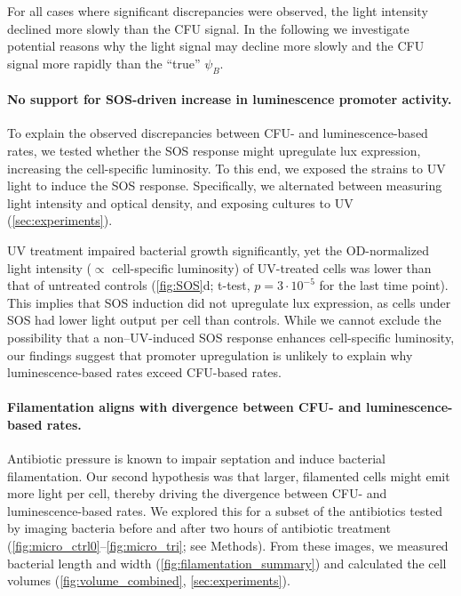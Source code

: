 For all cases where significant discrepancies were observed, the light intensity declined more slowly than the CFU signal.
In the following we investigate potential reasons why the light signal may decline more slowly and the CFU signal more rapidly than the ``true'' \(\psi_B\).

\paragraph{No support for SOS-driven increase in luminescence promoter activity.}
To explain the observed discrepancies between CFU- and luminescence-based rates, we tested whether the SOS response might upregulate lux expression, increasing the cell-specific luminosity.
To this end, we exposed the strains to UV light to induce the SOS response.
Specifically, we alternated between measuring light intensity and optical density, and exposing cultures to UV (\autoref{sec:experiments}).

UV treatment impaired bacterial growth significantly, yet the OD-normalized light intensity ($\propto$ cell-specific luminosity) of UV-treated cells was lower than that of untreated controls (\autoref{fig:SOS}d; t-test, $p = 3 \cdot 10^{-5}$ for the last time point).
This implies that SOS induction did not upregulate lux expression, as cells under SOS had lower light output per cell than controls.
While we cannot exclude the possibility that a non–UV-induced SOS response enhances cell-specific luminosity, our findings suggest that promoter upregulation is unlikely to explain why luminescence-based rates exceed CFU-based rates.

\paragraph{Filamentation aligns with divergence between CFU- and luminescence-based rates.}
Antibiotic pressure is known to impair septation and induce bacterial filamentation.
Our second hypothesis was that larger, filamented cells might emit more light per cell, thereby driving the divergence between CFU- and luminescence-based rates.
We explored this for a subset of the antibiotics tested by imaging bacteria before and after two hours of antibiotic treatment (\autoref{fig:micro_ctrl0}--\ref{fig:micro_tri}; see Methods).
From these images, we measured bacterial length and width (\autoref{fig:filamentation_summary}) and calculated the cell volumes (\autoref{fig:volume_combined}, \autoref{sec:experiments}).

